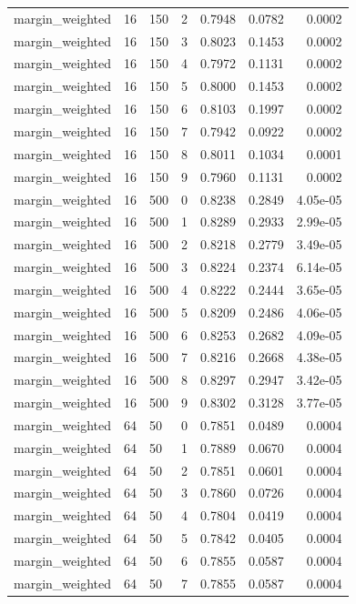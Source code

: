 \begin{footnotesize}
\begin{longtable}{lllrrrr}
margin\_weighted & 16 & 150 & 2 & 0.7948 & 0.0782 & 0.0002 \\
margin\_weighted & 16 & 150 & 3 & 0.8023 & 0.1453 & 0.0002 \\
margin\_weighted & 16 & 150 & 4 & 0.7972 & 0.1131 & 0.0002 \\
margin\_weighted & 16 & 150 & 5 & 0.8000 & 0.1453 & 0.0002 \\
margin\_weighted & 16 & 150 & 6 & 0.8103 & 0.1997 & 0.0002 \\
margin\_weighted & 16 & 150 & 7 & 0.7942 & 0.0922 & 0.0002 \\
margin\_weighted & 16 & 150 & 8 & 0.8011 & 0.1034 & 0.0001 \\
margin\_weighted & 16 & 150 & 9 & 0.7960 & 0.1131 & 0.0002 \\
margin\_weighted & 16 & 500 & 0 & 0.8238 & 0.2849 & 4.05e-05 \\
margin\_weighted & 16 & 500 & 1 & 0.8289 & 0.2933 & 2.99e-05 \\
margin\_weighted & 16 & 500 & 2 & 0.8218 & 0.2779 & 3.49e-05 \\
margin\_weighted & 16 & 500 & 3 & 0.8224 & 0.2374 & 6.14e-05 \\
margin\_weighted & 16 & 500 & 4 & 0.8222 & 0.2444 & 3.65e-05 \\
margin\_weighted & 16 & 500 & 5 & 0.8209 & 0.2486 & 4.06e-05 \\
margin\_weighted & 16 & 500 & 6 & 0.8253 & 0.2682 & 4.09e-05 \\
margin\_weighted & 16 & 500 & 7 & 0.8216 & 0.2668 & 4.38e-05 \\
margin\_weighted & 16 & 500 & 8 & 0.8297 & 0.2947 & 3.42e-05 \\
margin\_weighted & 16 & 500 & 9 & 0.8302 & 0.3128 & 3.77e-05 \\
margin\_weighted & 64 & 50 & 0 & 0.7851 & 0.0489 & 0.0004 \\
margin\_weighted & 64 & 50 & 1 & 0.7889 & 0.0670 & 0.0004 \\
margin\_weighted & 64 & 50 & 2 & 0.7851 & 0.0601 & 0.0004 \\
margin\_weighted & 64 & 50 & 3 & 0.7860 & 0.0726 & 0.0004 \\
margin\_weighted & 64 & 50 & 4 & 0.7804 & 0.0419 & 0.0004 \\
margin\_weighted & 64 & 50 & 5 & 0.7842 & 0.0405 & 0.0004 \\
margin\_weighted & 64 & 50 & 6 & 0.7855 & 0.0587 & 0.0004 \\
margin\_weighted & 64 & 50 & 7 & 0.7855 & 0.0587 & 0.0004 \\

\end{longtable}
\end{footnotesize}
